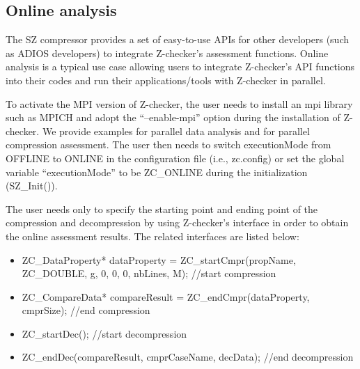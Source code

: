 \subsection{Online analysis}

The SZ compressor provides a set of easy-to-use APIs for other developers (such as ADIOS developers) to integrate Z-checker's assessment functions. Online analysis is a typical use case allowing users to integrate Z-checker's API functions into their codes and run their applications/tools with Z-checker in parallel.

To activate the MPI version of Z-checker, the user needs to install an mpi library such as MPICH and adopt the ``--enable-mpi'' option during the installation of Z-checker. We provide examples for parallel data analysis and for parallel compression assessment. The user then needs to switch executionMode from OFFLINE to ONLINE in the configuration file (i.e., zc.config) or set the global variable ``executionMode'' to be ZC\_ONLINE during the initialization (SZ\_Init()).

The user needs only to specify the starting point and ending point of the compression and decompression by using Z-checker's interface in order to obtain the online assessment results. The related interfaces are listed below:
\begin{itemize}
  \item ZC\_DataProperty* dataProperty = ZC\_startCmpr(propName, ZC\_DOUBLE, g, 0, 0, 0, nbLines, M); //start compression
  \item ZC\_CompareData* compareResult = ZC\_endCmpr(dataProperty, cmprSize); //end compression
  \item ZC\_startDec(); //start decompression
  \item ZC\_endDec(compareResult, cmprCaseName, decData); //end decompression
\end{itemize}

